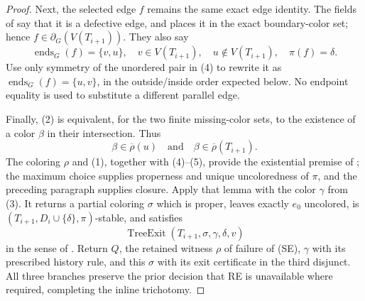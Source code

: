 \begin{proof}
Next, the selected edge \(f\) remains the same exact edge identity.
The fields of  say that it is a defective
edge, and  places it in the exact boundary-color
set; hence \(f\in\partial_G(V(T_{i+1}))\).  They also say
\[
 \operatorname{ends}_G(f)=\{v,u\},\quad
 v\in V(T_{i+1}),\quad u\notin V(T_{i+1}),\quad \pi(f)=\delta.   \tag{4}
\]
Use only symmetry of the unordered pair in (4) to rewrite it as
\(\operatorname{ends}_G(f)=\{u,v\}\), in the outside/inside order
expected below.  No endpoint equality is used to substitute a different
parallel edge.

Finally, (2) is equivalent, for the two finite missing-color sets, to
the existence of a color \(\beta\) in their intersection.  Thus
\[
       \beta\in\overline\rho(u)
       \quad\text{and}\quad
       \beta\in\overline\rho(T_{i+1}).                          \tag{5}
\]
The coloring \(\rho\) and (1), together with (4)--(5), provide the
existential premise of ; the maximum choice supplies
properness and unique uncoloredness of \(\pi\), and the preceding
paragraph supplies closure.  Apply that lemma with the color \(\gamma\)
from (3).  It returns a partial coloring \(\sigma\) which is proper,
leaves exactly \(e_0\) uncolored, is
\((T_{i+1},D_i\cup\{\delta\},\pi)\)-stable, and satisfies
\[
                  \operatorname{TreeExit}
                    (T_{i+1},\sigma,\gamma,\delta,v)
\]
in the sense of .  Return \(Q\), the retained witness
\(\rho\) of failure of (SE), \(\gamma\) with its prescribed history rule,
and this \(\sigma\) with its exit certificate in the third disjunct.
All three branches preserve the prior decision that RE is unavailable
where required, completing the inline trichotomy.
\end{proof}
